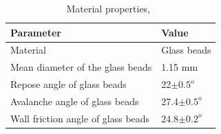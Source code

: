 \begin{table}[tbhp]
\caption{Material properties,~\citep{Lajeunesse2005}}
\label{Table:MP}
\centering
\begin{tabular}{ll}
\toprule
\textbf{Parameter} & \textbf{Value} \\ \midrule
Material & Glass beads \\ 
Mean diameter of the glass beads & 1.15 mm \\
Repose angle of glass beads & 22$\pm 0.5^{o} $\\
Avalanche angle of glass beads & 27.4$\pm 0.5^{o} $\\
Wall friction angle of glass beads & 24.8$\pm 0.2^{o} $\\
\bottomrule
\end{tabular}
\end{table}